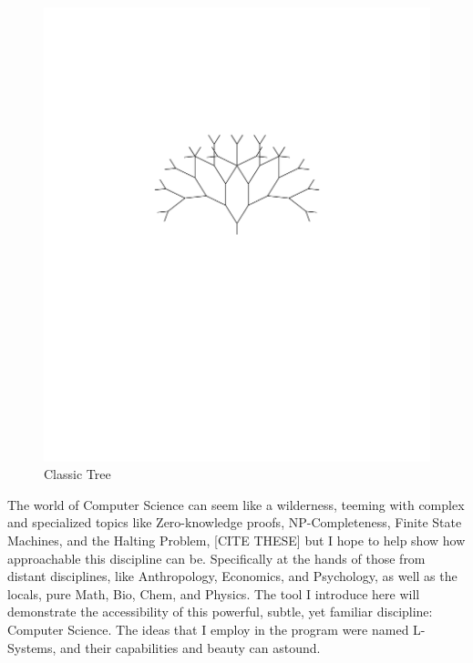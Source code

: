 \documentclass[12pt,twoside]{reedthesis}
\begin{document}
	\begin{figure}[h]
	\centering
	\includegraphics[clip=true, viewport=2.5in 5.5in 7.5in 8.5in, scale=1]{Images/Introduction1} %
	\caption[Classic Tree]{Classic Tree\footnotemark}
	\label {Introduction1}
	\end{figure}


The world of Computer Science can seem like a wilderness, teeming with complex and specialized topics like Zero-knowledge proofs, NP-Completeness, Finite State Machines, and the Halting Problem, [CITE THESE] but I hope to help show how approachable this discipline can be. Specifically at the hands of those from distant disciplines, like Anthropology, Economics, and Psychology, as well as the locals, pure Math, Bio, Chem, and Physics. The tool I introduce here will demonstrate the accessibility of this powerful, subtle, yet familiar discipline: Computer Science. The ideas that I employ in the program were named L-Systems, and their capabilities and beauty can astound.
	
\end{document}
